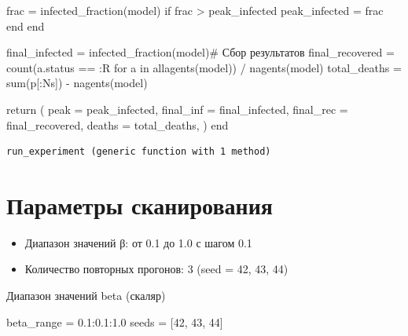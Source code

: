 \documentclass[
  12pt,
  a4paper,
  DIV=11,
  numbers=noendperiod]{scrreprt}
\newenvironment{Shaded}{\begin{snugshade}}{\end{snugshade}}
\newcommand{\CommentTok}[1]{\textcolor[rgb]{0.37,0.37,0.37}{#1}}
\newcommand{\ControlFlowTok}[1]{\textcolor[rgb]{0.00,0.23,0.31}{#1}}
\newcommand{\FloatTok}[1]{\textcolor[rgb]{0.68,0.00,0.00}{#1}}
\newcommand{\FunctionTok}[1]{\textcolor[rgb]{0.28,0.35,0.67}{#1}}
\newcommand{\KeywordTok}[1]{\textcolor[rgb]{0.00,0.23,0.31}{#1}}
\newcommand{\NormalTok}[1]{\textcolor[rgb]{0.00,0.23,0.31}{#1}}
\newcommand{\OperatorTok}[1]{\textcolor[rgb]{0.37,0.37,0.37}{#1}}
\providecommand{\tightlist}{%
  \setlength{\itemsep}{0pt}\setlength{\parskip}{0pt}}\usepackage{longtable,booktabs,array}
\begin{document}
\begin{Shaded}
\begin{Highlighting}[]
\NormalTok{        frac }\OperatorTok{=} \FunctionTok{infected\_fraction}\NormalTok{(model)}
        \ControlFlowTok{if}\NormalTok{ frac }\OperatorTok{\textgreater{}}\NormalTok{ peak\_infected}
\NormalTok{            peak\_infected }\OperatorTok{=}\NormalTok{ frac}
        \ControlFlowTok{end}
    \ControlFlowTok{end}

\NormalTok{    final\_infected }\OperatorTok{=} \FunctionTok{infected\_fraction}\NormalTok{(model)}\CommentTok{\# Сбор результатов}
\NormalTok{    final\_recovered }\OperatorTok{=} \FunctionTok{count}\NormalTok{(a.status }\OperatorTok{==} \OperatorTok{:}\NormalTok{R }\ControlFlowTok{for}\NormalTok{ a }\KeywordTok{in} \FunctionTok{allagents}\NormalTok{(model)) }\OperatorTok{/} \FunctionTok{nagents}\NormalTok{(model)}
\NormalTok{    total\_deaths }\OperatorTok{=} \FunctionTok{sum}\NormalTok{(p[}\OperatorTok{:}\NormalTok{Ns]) }\OperatorTok{{-}} \FunctionTok{nagents}\NormalTok{(model)}

    \ControlFlowTok{return}\NormalTok{ (}
\NormalTok{        peak }\OperatorTok{=}\NormalTok{ peak\_infected,}
\NormalTok{        final\_inf }\OperatorTok{=}\NormalTok{ final\_infected,}
\NormalTok{        final\_rec }\OperatorTok{=}\NormalTok{ final\_recovered,}
\NormalTok{        deaths }\OperatorTok{=}\NormalTok{ total\_deaths,}
\NormalTok{    )}
\ControlFlowTok{end}
\end{Highlighting}
\end{Shaded}

\begin{verbatim}
run_experiment (generic function with 1 method)
\end{verbatim}

\section{Параметры
сканирования}\label{ux43fux430ux440ux430ux43cux435ux442ux440ux44b-ux441ux43aux430ux43dux438ux440ux43eux432ux430ux43dux438ux44f-1}

\begin{itemize}
\tightlist
\item
  Диапазон значений β: от 0.1 до 1.0 с шагом 0.1
\item
  Количество повторных прогонов: 3 (seed = 42, 43, 44)
\end{itemize}

Диапазон значений beta (скаляр)

\begin{Shaded}
\begin{Highlighting}[]
\NormalTok{beta\_range }\OperatorTok{=} \FloatTok{0.1}\OperatorTok{:}\FloatTok{0.1}\OperatorTok{:}\FloatTok{1.0}
\NormalTok{seeds }\OperatorTok{=}\NormalTok{ [}\FloatTok{42}\NormalTok{, }\FloatTok{43}\NormalTok{, }\FloatTok{44}\NormalTok{]}
\end{Highlighting}
\end{Shaded}
\end{document}
